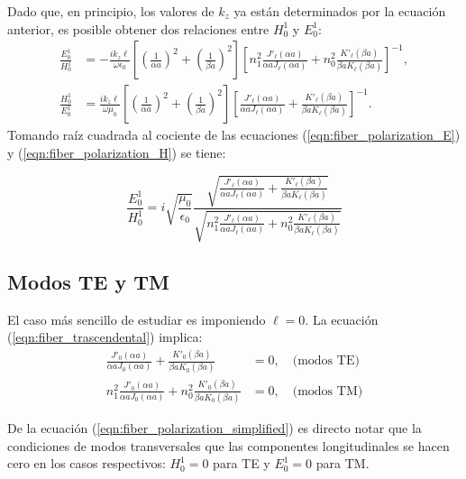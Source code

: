 Dado que, en principio, los valores de $k_z$ ya están determinados por la ecuación anterior, es posible obtener dos relaciones entre $H_0^1$ y $E_0^1$:
\begin{align}
\frac{E_0^1}{H_0^1} &=  -\frac{i k_z \ell}{\omega\epsilon_0}\left[ \left(\frac{1}{\alpha a}\right)^2 + \left(\frac{1}{\beta a}\right)^2 \right]  \left[ n_1^2 \frac{J'_\ell(\alpha a)}{\alpha a J_\ell(\alpha a)} + n_0^2 \frac{K'_\ell(\beta a)}{\beta a K_\ell(\beta a)} \right]^{-1} \label{eqn:fiber_polarization_E},
\\
\frac{H_0^1}{E_0^1} &=  \frac{i k_z \ell}{ \omega\mu_0}\left[ \left(\frac{1}{\alpha a}\right)^2 + \left(\frac{1}{\beta a}\right)^2 \right]  \left[ \frac{J'_\ell(\alpha a)}{\alpha a J_\ell(\alpha a)} + \frac{K'_\ell(\beta a)}{\beta a K_\ell(\beta a)} \right]^{-1} \label{eqn:fiber_polarization_H}.
\end{align}
Tomando raíz cuadrada al cociente de las ecuaciones (\ref{eqn:fiber_polarization_E}) y (\ref{eqn:fiber_polarization_H}) se tiene:

\begin{equation}
	\frac{E_0^1}{H_0^1} = i \sqrt{\frac{\mu_0}{\epsilon_0}} \frac{\sqrt{ \frac{J'_\ell(\alpha a)}{\alpha a J_\ell(\alpha a)} + \frac{K'_\ell(\beta a)}{\beta a K_\ell(\beta a)}}}{\sqrt{n_1^2 \frac{J'_\ell(\alpha a)}{\alpha a J_\ell(\alpha a)} + n_0^2 \frac{K'_\ell(\beta a)}{\beta a K_\ell(\beta a)}}}
	\label{eqn:fiber_polarization_simplified}
\end{equation}

\subsection{Modos TE y TM}
El caso más sencillo de estudiar es imponiendo $\ell = 0$. La ecuación (\ref{eqn:fiber_trascendental}) implica:
\begin{align*}
	\frac{J'_{0}(\alpha a)}{\alpha a J_0(\alpha a)} + \frac{K'_0(\beta a)}{\beta a K_0(\beta a)}&=  0, \quad \text{(modos TE)}
	\\
	n_1^2\frac{J'_{0}(\alpha a)}{\alpha a J_0(\alpha a)} + n_0^2 \frac{K'_0(\beta a)}{\beta a K_0(\beta a)} &= 0, \quad \text{(modos TM)}
\end{align*}

De la ecuación (\ref{eqn:fiber_polarization_simplified}) es directo notar que la condiciones de modos transversales que las componentes longitudinales se hacen cero en los casos respectivos: $H_0^1 = 0$ para TE y $E_0^1 = 0$ para TM.

